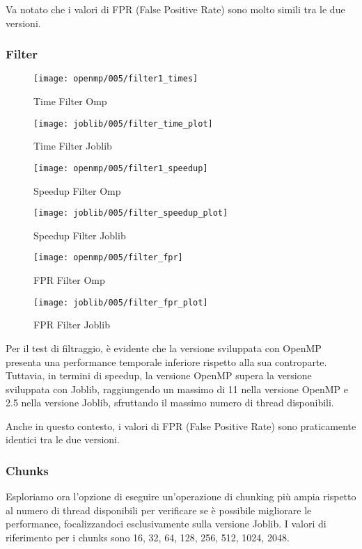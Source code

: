 Va notato che i valori di FPR (False Positive Rate) sono molto simili tra le due versioni.

\subsubsection{Filter}\label{subsubsec:fpr-005-filter}
\begin{figure}[H]
    \centering
    \texttt{[image: openmp/005/filter1\_times]}
        \caption{Time Filter Omp}\label{fig:005-filter_time_omp}
    \endminipage\hfill
    \texttt{[image: joblib/005/filter\_time\_plot]}
        \caption{Time Filter Joblib}\label{fig:005-filter_time_joblib}
    \endminipage\hfill
\end{figure}
\begin{figure}[H]
    \centering
    \texttt{[image: openmp/005/filter1\_speedup]}
        \caption{Speedup Filter Omp}\label{fig:005-filter_speedup_omp}
    \endminipage\hfill
    \texttt{[image: joblib/005/filter\_speedup\_plot]}
        \caption{Speedup Filter Joblib}\label{fig:005-filter_speedup_joblib}
    \endminipage\hfill
\end{figure}
\begin{figure}[H]
    \centering
    \texttt{[image: openmp/005/filter\_fpr]}
        \caption{FPR Filter Omp}\label{fig:005-filter_fpr_omp}
    \endminipage\hfill
    \texttt{[image: joblib/005/filter\_fpr\_plot]}
        \caption{FPR Filter Joblib}\label{fig:005-filter_fpr_joblib}
    \endminipage\hfill
\end{figure}

Per il test di filtraggio, è evidente che la versione sviluppata con OpenMP presenta una performance temporale
inferiore rispetto alla sua controparte.
Tuttavia, in termini di speedup, la versione OpenMP supera la versione sviluppata con Joblib, raggiungendo un
massimo di 11 nella versione OpenMP e 2.5 nella versione Joblib, sfruttando il massimo numero di thread disponibili.

Anche in questo contesto, i valori di FPR (False Positive Rate) sono praticamente identici tra le due versioni.

\subsubsection{Chunks}\label{subsubsec:005-chunks}
Esploriamo ora l'opzione di eseguire un'operazione di chunking più ampia rispetto al numero di thread disponibili per
verificare se è possibile migliorare le performance, focalizzandoci esclusivamente sulla versione Joblib.
I valori di riferimento per i chunks sono 16, 32, 64, 128, 256, 512, 1024, 2048.

